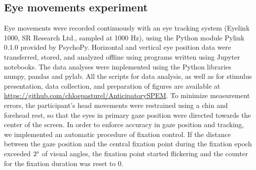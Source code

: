 \documentclass[10pt,letterpaper]{article}
\begin{document}
\subsection*{Eye movements experiment}
Eye movements were recorded continuously with an eye tracking system (Eyelink 1000, SR Research Ltd., sampled at 1000 Hz), using the Python module Pylink 0.1.0 provided by PsychoPy. Horizontal and vertical eye position data were transferred, stored, and analyzed offline using programs written using Jupyter notebooks. The data analyses were implemented using the Python libraries numpy, pandas and pylab. All the scripts for data analysis, as well as for stimulus presentation, data collection, and preparation of figures are available at \url{https://github.com/chloepasturel/AnticipatorySPEM}. To minimize measurement errors, the participant's head movements were restrained using a chin and forehead rest, so that the eyes in primary gaze position were directed towards the center of the screen. In order to enforce accuracy in gaze position and tracking, we implemented an automatic procedure of fixation control. If the distance between the gaze position and the central fixation point during the fixation epoch exceeded $2\degree$ of visual angles, the fixation point started flickering and the counter for the fixation duration was reset to $0$.
\end{document}

